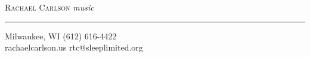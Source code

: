 \documentclass[11pt,a4paper]{memoir}
\begin{document}
\begin{center}
\vspace*{4mm}
\textsc{\huge{Rachael Carlson}}\break
\emph{\tiny{music}}
\bigskip\break
\hrule
\vfill
\tiny{Milwaukee, WI \hfill (612) 616-4422} \\ 
\tiny{rachaelcarlson.us} \hfill \tiny{rtc@sleeplimited.org} %
\end{center}
\end{document}
